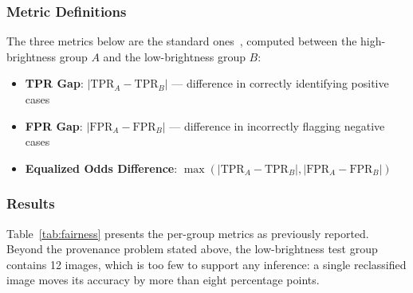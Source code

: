 \documentclass[ai,article,submit,pdftex,moreauthors]{Definitions/mdpi}
\begin{document}
\subsubsection{Metric Definitions}

The three metrics below are the standard ones~\cite{hardt2016}, computed between the high-brightness group $A$ and the low-brightness group $B$:
\begin{itemize}[leftmargin=*, itemsep=2pt]
    \item \textbf{TPR Gap}: $|\text{TPR}_{A} - \text{TPR}_{B}|$ --- difference in correctly identifying positive cases
    \item \textbf{FPR Gap}: $|\text{FPR}_{A} - \text{FPR}_{B}|$ --- difference in incorrectly flagging negative cases
    \item \textbf{Equalized Odds Difference}: $\max(|\text{TPR}_{A} - \text{TPR}_{B}|, |\text{FPR}_{A} - \text{FPR}_{B}|)$
\end{itemize}

\subsubsection{Results}

Table~\ref{tab:fairness} presents the per-group metrics as previously reported. Beyond the provenance problem stated above, the low-brightness test group contains 12 images, which is too few to support any inference: a single reclassified image moves its accuracy by more than eight percentage points.
\end{document}
